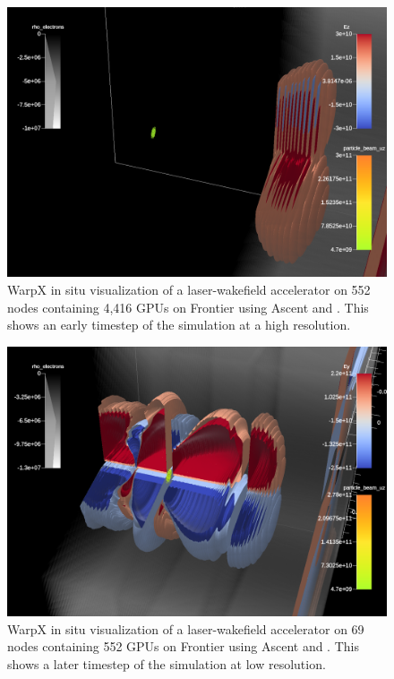 \begin{figure}
    \centering
    \includegraphics[width=\linewidth]{figures/ez_007050.png}
    \caption{WarpX in situ visualization of a laser-wakefield accelerator on 552 nodes containing 4,416 GPUs on Frontier using Ascent and \vtkm. This shows an early timestep of the simulation at a high resolution.}
    \label{fig:warpx_highres}
\end{figure}

\begin{figure}
    \centering
    \includegraphics[width=\linewidth]{figures/ey_009300.png}
    \caption{WarpX in situ visualization of a laser-wakefield accelerator on 69 nodes containing 552 GPUs on Frontier using Ascent and \vtkm. This shows a later timestep of the simulation at low resolution.}
    \label{fig:warpx_lowres}
\end{figure}

